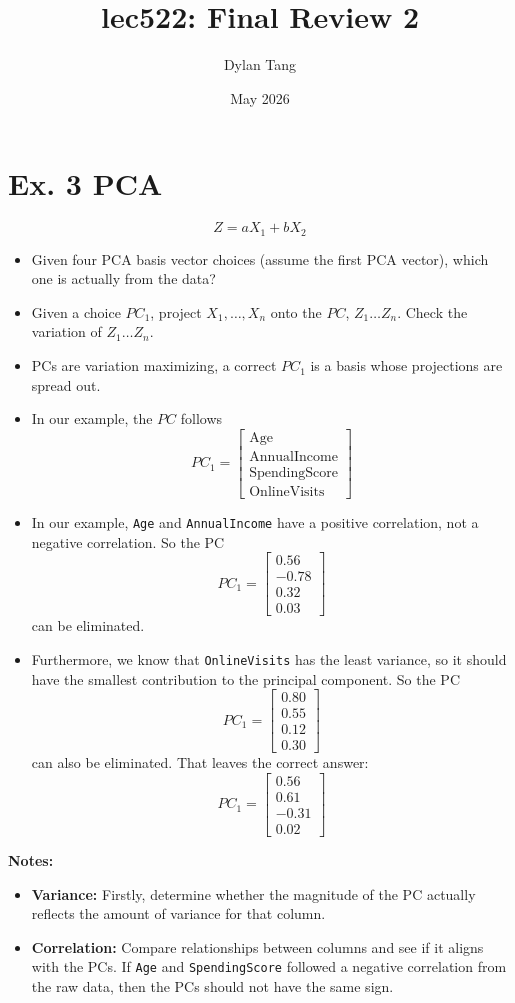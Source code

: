 \documentclass{article}
\title{lec522: Final Review 2}
\author{Dylan Tang}
\date{May 2026}
\begin{document}
\maketitle

\section{Ex. 3 PCA}

\[
    Z = aX_1 + bX_2
\]
\begin{itemize}
    \item Given four PCA basis vector choices (assume the first PCA vector), which one is actually from the data?
    \item Given a choice $PC_1$, project $X_1, \dots, X_n$ onto the $PC$, $Z_1 \dots Z_n$. Check the variation of $Z_1 \dots Z_n$.
    \item PCs are variation maximizing, a correct $PC_1$ is a basis whose projections are spread out.
    \item In our example, the $PC$ follows
    \[
        PC_1 =  \begin{bmatrix} \text{Age} \\ \text{AnnualIncome} \\ \text{SpendingScore} \\ \text{OnlineVisits} \end{bmatrix}
    \]
    \item In our example, \texttt{Age} and \texttt{AnnualIncome} have a positive correlation, not a negative correlation. So the PC
    \[
        PC_1 = \begin{bmatrix} 0.56 \\ -0.78 \\ 0.32 \\ 0.03\end{bmatrix}
    \] can be eliminated.
    \item Furthermore, we know that \texttt{OnlineVisits} has the least variance, so it should have the smallest contribution to the principal component. So the PC
    \[
        PC_1 = \begin{bmatrix} 0.80 \\ 0.55 \\ 0.12 \\ 0.30\end{bmatrix}
    \] can also be eliminated.
    That leaves the correct answer:
    \[
         PC_1 = \begin{bmatrix} 0.56 \\ 0.61 \\ -0.31 \\ 0.02\end{bmatrix}
    \]
\end{itemize}
\textbf{Notes:}
\begin{itemize}
    \item \textbf{Variance: }  Firstly, determine whether the magnitude of the PC actually reflects the amount of variance for that column.
    \item \textbf{Correlation: }Compare relationships between columns and see if it aligns with the PCs. If \texttt{Age} and \texttt{SpendingScore} followed a negative correlation from the raw
    data, then the PCs should not have the same sign.
\end{itemize}
\end{document}
